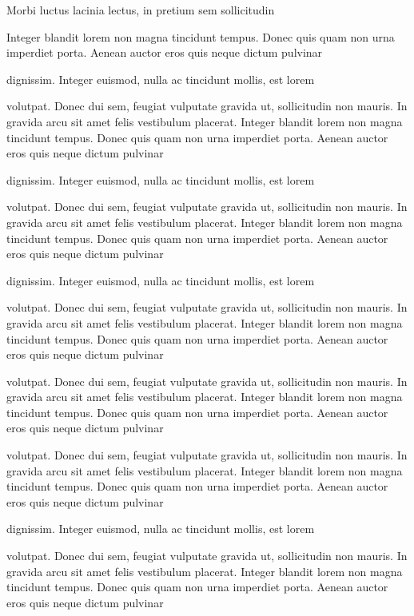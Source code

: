 
\raggedbottom

Morbi luctus lacinia lectus, in pretium sem sollicitudin

\startrule %
Integer blandit lorem non magna tincidunt tempus. Donec quis quam non
urna imperdiet porta. Aenean auctor eros quis neque dictum pulvinar

dignissim. Integer euismod, nulla ac tincidunt mollis, est lorem

volutpat. Donec dui sem, feugiat vulputate gravida ut, sollicitudin
non mauris. In gravida arcu sit amet felis vestibulum placerat.
Integer blandit lorem non magna tincidunt tempus. Donec quis quam non
urna imperdiet porta. Aenean auctor eros quis neque dictum pulvinar

dignissim. Integer euismod, nulla ac tincidunt mollis, est lorem

volutpat. Donec dui sem, feugiat vulputate gravida ut, sollicitudin
non mauris. In gravida arcu sit amet felis vestibulum placerat.
Integer blandit lorem non magna tincidunt tempus. Donec quis quam non
urna imperdiet porta. Aenean auctor eros quis neque dictum pulvinar

dignissim. Integer euismod, nulla ac tincidunt mollis, est lorem

volutpat. Donec dui sem, feugiat vulputate gravida ut, sollicitudin
non mauris. In gravida arcu sit amet felis vestibulum placerat.
Integer blandit lorem non magna tincidunt tempus. Donec quis quam non
urna imperdiet porta. Aenean auctor eros quis neque dictum pulvinar

volutpat. Donec dui sem, feugiat vulputate gravida ut, sollicitudin
non mauris. In gravida arcu sit amet felis vestibulum placerat.
Integer blandit lorem non magna tincidunt tempus. Donec quis quam non
urna imperdiet porta. Aenean auctor eros quis neque dictum pulvinar

volutpat. Donec dui sem, feugiat vulputate gravida ut, sollicitudin
non mauris. In gravida arcu sit amet felis vestibulum placerat.
Integer blandit lorem non magna tincidunt tempus. Donec quis quam non
urna imperdiet porta. Aenean auctor eros quis neque dictum pulvinar

dignissim. Integer euismod, nulla ac tincidunt mollis, est lorem

volutpat. Donec dui sem, feugiat vulputate gravida ut, sollicitudin
non mauris. In gravida arcu sit amet felis vestibulum placerat.
Integer blandit lorem non magna tincidunt tempus. Donec quis quam non
urna imperdiet porta. Aenean auctor eros quis neque dictum pulvinar

